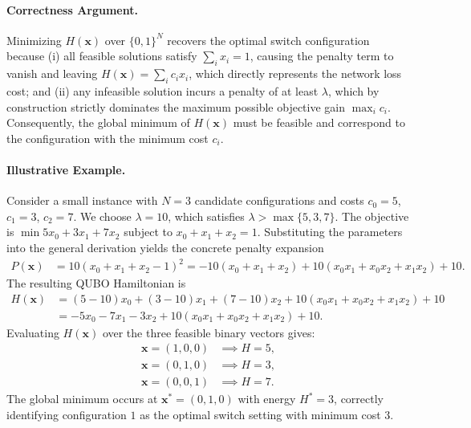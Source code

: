 \documentclass[12pt]{article}
\begin{document}
\paragraph{Correctness Argument.}
Minimizing $H(\mathbf{x})$ over $\{0,1\}^N$ recovers the optimal switch configuration because (i) all feasible solutions satisfy $\sum_i x_i = 1$, causing the penalty term to vanish and leaving $H(\mathbf{x}) = \sum_i c_i x_i$, which directly represents the network loss cost; and (ii) any infeasible solution incurs a penalty of at least $\lambda$, which by construction strictly dominates the maximum possible objective gain $\max_i c_i$. Consequently, the global minimum of $H(\mathbf{x})$ must be feasible and correspond to the configuration with the minimum cost $c_i$.

\paragraph{Illustrative Example.}
Consider a small instance with $N=3$ candidate configurations and costs $c_0 = 5$, $c_1 = 3$, $c_2 = 7$. We choose $\lambda = 10$, which satisfies $\lambda > \max\{5, 3, 7\}$. The objective is $\min 5x_0 + 3x_1 + 7x_2$ subject to $x_0 + x_1 + x_2 = 1$. Substituting the parameters into the general derivation yields the concrete penalty expansion
\begin{align}
    P(\mathbf{x}) &= 10(x_0 + x_1 + x_2 - 1)^2 = -10(x_0 + x_1 + x_2) + 10(x_0x_1 + x_0x_2 + x_1x_2) + 10.
\end{align}
The resulting QUBO Hamiltonian is
\begin{align}
    H(\mathbf{x}) &= (5-10)x_0 + (3-10)x_1 + (7-10)x_2 + 10(x_0x_1 + x_0x_2 + x_1x_2) + 10 \\
    &= -5x_0 - 7x_1 - 3x_2 + 10(x_0x_1 + x_0x_2 + x_1x_2) + 10.
\end{align}
Evaluating $H(\mathbf{x})$ over the three feasible binary vectors gives:
\begin{align}
    \mathbf{x} = (1,0,0) &\implies H = 5, \\
    \mathbf{x} = (0,1,0) &\implies H = 3, \\
    \mathbf{x} = (0,0,1) &\implies H = 7.
\end{align}
The global minimum occurs at $\mathbf{x}^* = (0,1,0)$ with energy $H^* = 3$, correctly identifying configuration $1$ as the optimal switch setting with minimum cost $3$.
\end{document}
